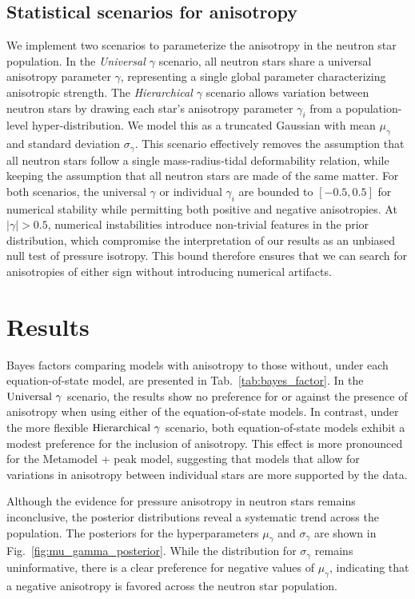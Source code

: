 \documentclass[prd,twocolumn,a4paper,floatfix,nofootinbib,preprintnumbers,superscriptaddress]{revtex4-1}
\begin{document}
\subsection{Statistical scenarios for anisotropy}
\label{sec:gamma_stat_setup}
We implement two scenarios to parameterize the anisotropy in the neutron star population. In the \textit{Universal $\gamma$} scenario, all neutron stars share a universal anisotropy parameter $\gamma$, representing a single global parameter characterizing anisotropic strength. The \textit{Hierarchical $\gamma$} scenario allows variation between neutron stars by drawing each star's anisotropy parameter $\gamma_i$ from a population-level hyper-distribution. We model this as a truncated Gaussian with mean $\mu_{\gamma}$ and standard deviation $\sigma_{\gamma}$. This scenario effectively removes the assumption that all neutron stars follow a single mass-radius-tidal deformability relation, while keeping the assumption that all neutron stars are made of the same matter. For both scenarios, the universal $\gamma$ or individual $\gamma_i$ are bounded to $[-0.5, 0.5]$ for numerical stability while permitting both positive and negative anisotropies. At $\vert\gamma\vert > 0.5$, numerical instabilities introduce non-trivial features in the prior distribution, which compromise the interpretation of our results as an unbiased null test of pressure isotropy. This bound therefore ensures that we can search for anisotropies of either sign without introducing numerical artifacts.

\section{Results}
Bayes factors comparing models with anisotropy to those without, under each equation-of-state model, are presented in Tab.~\ref{tab:bayes_factor}. In the ${\rm Universal\ } \gamma$ scenario, the results show no preference for or against the presence of anisotropy when using either of the equation-of-state models. In contrast, under the more flexible ${\rm Hierarchical \ } \gamma$ scenario, both equation-of-state models exhibit a modest preference for the inclusion of anisotropy. This effect is more pronounced for the Metamodel + peak model, suggesting that models that allow for variations in anisotropy between individual stars are more supported by the data.

Although the evidence for pressure anisotropy in neutron stars remains inconclusive, the posterior distributions reveal a systematic trend across the population. The posteriors for the hyperparameters $\mu_{\gamma}$ and $\sigma_\gamma$ are shown in Fig.~\ref{fig:mu_gamma_posterior}. While the distribution for $\sigma_\gamma$ remains uninformative, there is a clear preference for negative values of $\mu_\gamma$, indicating that a negative anisotropy is favored across the neutron star population.
\end{document}
